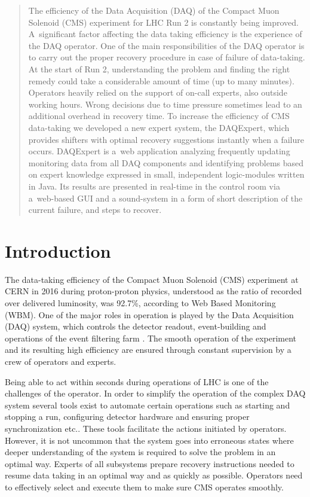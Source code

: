 \documentclass[a4paper]{jpconf}
\begin{document}
\begin{abstract}
The efficiency of the Data Acquisition (DAQ) of the Compact Muon Solenoid (CMS) experiment for LHC Run 2 is constantly being improved. A~significant factor affecting the data taking efficiency is the experience of the DAQ operator. One of the main responsibilities of the DAQ operator is to carry out the proper recovery procedure in case of failure of data-taking. At the start of Run 2, understanding the problem and finding the right remedy could take a considerable amount of time (up to many minutes). Operators heavily relied on the support of on-call experts, also outside working hours. Wrong decisions due to time pressure sometimes lead to an additional overhead in recovery time. To increase the efficiency of CMS data-taking we developed a new expert system, the DAQExpert, which provides shifters with optimal recovery suggestions instantly when a failure occurs. DAQExpert is a~web application analyzing frequently updating monitoring data from all DAQ components and identifying problems based on expert knowledge expressed in small, independent logic-modules written in Java. Its results are presented in real-time in the control room via a~web-based GUI and a sound-system in a form of short description of the current failure, and steps to recover.
\end{abstract}

\section{Introduction}
The data-taking efficiency of the Compact Muon Solenoid (CMS) \cite{cms} experiment at CERN in 2016 during proton-proton physics, understood as the ratio of recorded over delivered luminosity, was 92.7\%, according to Web Based Monitoring (WBM). One of the major roles in operation is played by the Data Acquisition (DAQ) system, which controls the detector readout, event-building and operations of the event filtering farm \cite{daq}. The smooth operation of the experiment and its resulting high efficiency are ensured through constant supervision by a crew of operators and experts.

Being able to act within seconds during operations of LHC is one of the challenges of the operator. In order to simplify the operation of the complex DAQ system several tools exist to automate certain operations such as starting and stopping a run, configuring detector hardware and ensuring proper synchronization etc.\cite{assistance}. These tools facilitate the actions initiated by operators. However, it is not uncommon that the system goes into erroneous states where deeper understanding of the system is required to solve the problem in an optimal way. Experts of all subsystems prepare recovery instructions needed to resume data taking in an optimal way and as quickly as possible. Operators need to effectively select and execute them to make sure CMS operates smoothly.
\end{document}
